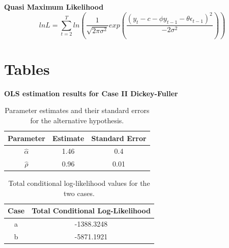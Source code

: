 \documentclass[11pt]{article}
\begin{document}
\textbf{Quasi Maximum Likelihood}
 \begin{equation}
     ln L = \sum_{t=2}^{T} ln (\frac{1}{\sqrt{2\pi \sigma^2}} exp(\frac{(y_t -c -\phi y_{t-1} - \theta \epsilon_{t-1})^2}{-2 \sigma^2} ))
     \label{eq:QML}
 \end{equation}

\newpage
\section{Tables}
\textbf{OLS estimation results for Case II Dickey-Fuller}
\begin{table}[h!]
\centering
\begin{tabular}{|c|c|c|}
\hline
\textbf{Parameter} & \textbf{Estimate} & \textbf{Standard Error} \\ \hline
$\hat{\alpha}$     & 1.46              & 0.4                     \\ \hline
$\hat{\rho}$       & 0.96              & 0.01                    \\ \hline
\end{tabular}
\caption{Parameter estimates and their standard errors for the alternative hypothesis.}
\label{tab:parameter_estimates}
\end{table}

\begin{table}[h!]
\centering
\begin{tabular}{|c|c|}
\hline
\textbf{Case} & \textbf{Total Conditional Log-Likelihood} \\ \hline
a             & -1388.3248                                \\ \hline
b             & -5871.1921                                \\ \hline
\end{tabular}
\caption{Total conditional log-likelihood values for the two cases.}
\label{tab:log_likelihood_results}
\end{table}
\end{document}
